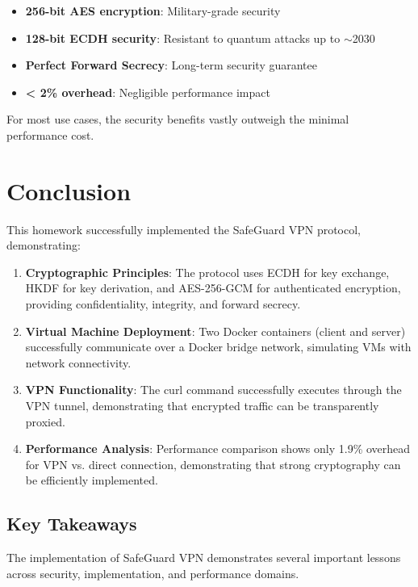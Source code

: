 \documentclass[12pt,a4paper]{article}
\begin{document}
\begin{itemize}
    \item \textbf{256-bit AES encryption}: Military-grade security
    \item \textbf{128-bit ECDH security}: Resistant to quantum attacks up to $\sim$2030
    \item \textbf{Perfect Forward Secrecy}: Long-term security guarantee
    \item \textbf{< 2\% overhead}: Negligible performance impact
\end{itemize}

For most use cases, the security benefits vastly outweigh the minimal performance cost.

\section{Conclusion}

This homework successfully implemented the SafeGuard VPN protocol, demonstrating:

\begin{enumerate}
    \item \textbf{Cryptographic Principles}: The protocol uses ECDH for key exchange, HKDF for key derivation, and AES-256-GCM for authenticated encryption, providing confidentiality, integrity, and forward secrecy.
    
    \item \textbf{Virtual Machine Deployment}: Two Docker containers (client and server) successfully communicate over a Docker bridge network, simulating VMs with network connectivity.
    
    \item \textbf{VPN Functionality}: The curl command successfully executes through the VPN tunnel, demonstrating that encrypted traffic can be transparently proxied.
    
    \item \textbf{Performance Analysis}: Performance comparison shows only 1.9\% overhead for VPN vs. direct connection, demonstrating that strong cryptography can be efficiently implemented.
\end{enumerate}

\subsection{Key Takeaways}

The implementation of SafeGuard VPN demonstrates several important lessons across security, implementation, and performance domains. \newline
\end{document}
